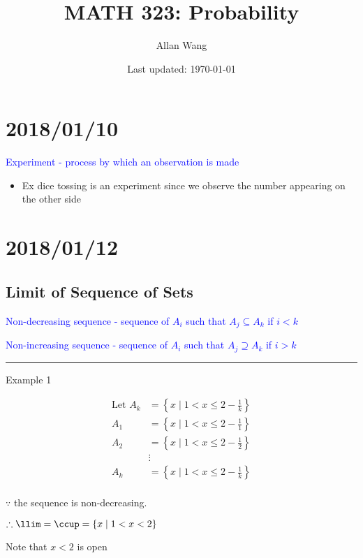 \documentclass[12pt]{article}
\author{Allan Wang}
\date{Last updated: \today}
\title{MATH 323: Probability}
\newcommand{\ddef}[1]{\textcolor{blue}{#1}}
\newcommand{\braces}[1]{\left\{#1\right\}}
\newcommand{\divider}[0]{\rule{\textwidth}{0.1pt}}
\begin{document}
\onehalfspacing
\maketitle
\tableofcontents
\pagebreak
\section{2018/01/10}

\ddef{Experiment - process by which an observation is made}

\begin{itemize}
    \item Ex dice tossing is an experiment since we observe the number appearing on the other side
\end{itemize}

\section{2018/01/12}

\subsection{Limit of Sequence of Sets}

\ddef{Non-decreasing sequence - sequence of \(A_i\) such that \(A_j \subseteq A_k\) if \(i < k\)}

\ddef{Non-increasing sequence - sequence of \(A_i\) such that \(A_j \supseteq A_k\) if \(i > k\)}

\divider

Example 1

\begin{equation}
\begin{split}
	\text{Let } A_k & = \braces{x \mid 1 < x \le 2 - \frac{1}{k}} \\
	A_1 & = \braces{x \mid 1 < x \le 2 - \frac{1}{1}} \\
	A_2 & = \braces{x \mid 1 < x \le 2 - \frac{1}{2}} \\
	& \vdots \\
	A_k & = \braces{x \mid 1 < x \le 2 - \frac{1}{k}} \\
\end{split}
\end{equation}

\(\because\) the sequence is non-decreasing.

\(\therefore \llim = \ccup = \braces{x \mid 1 < x < 2}\)

Note that \(x < 2\) is open
\end{document}
